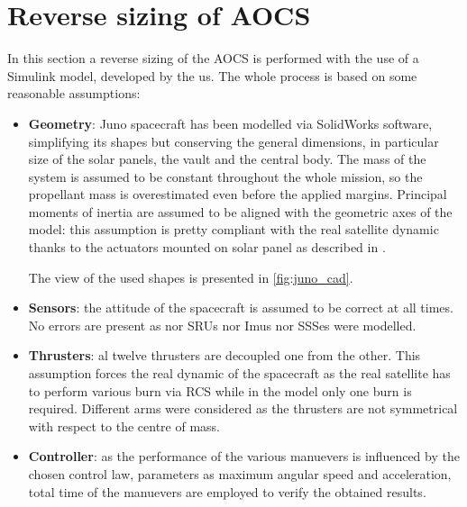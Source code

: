 \section{Reverse sizing of AOCS}
\label{sec:AOCS_sizing}

In this section a reverse sizing of the AOCS is performed with the use of a Simulink model, developed by the us. The whole process is based on some reasonable assumptions:

\begin{itemize}
    \item \textbf{Geometry}: Juno spacecraft has been modelled via SolidWorks software, simplifying its shapes but conserving the general dimensions, in particular size of the solar panels, the vault and the central body. The mass of the system is assumed to be constant throughout the whole mission, so the propellant mass is overestimated even before the applied margins. 
    Principal moments of inertia are assumed to be aligned with the geometric axes of the model: this assumption is pretty compliant with the real satellite dynamic thanks to the actuators mounted on solar panel as described in \mref. 
       
    The view of the used shapes is presented in \autoref{fig:juno_cad}.

    \item \textbf{Sensors}: the attitude of the spacecraft is assumed to be correct at all times. No errors are present as nor SRUs nor Imus nor SSSes were modelled.
    \item \textbf{Thrusters}: al twelve thrusters are decoupled one from the other. This assumption forces the real dynamic of the spacecraft as the real satellite has to perform various burn via RCS while in the model only one burn is required. %
    Different arms were considered as the thrusters are not symmetrical with respect to the centre of mass. 

    \item \textbf{Controller}: as the performance of the various manuevers is influenced by the chosen control law, parameters as maximum angular speed and acceleration, total time of the manuevers are employed to verify the obtained results. 
    

\end{itemize}
